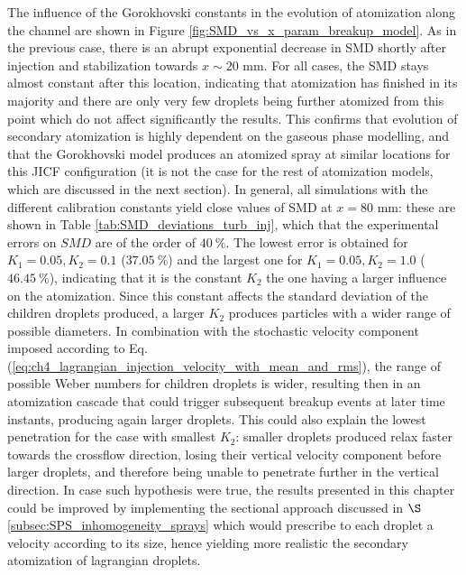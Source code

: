 The influence of the Gorokhovski constants in the evolution of atomization along the channel are shown in Figure \ref{fig:SMD_vs_x_param_breakup_model}. As in the previous case, there is an abrupt exponential decrease in SMD shortly after injection and stabilization towards $x \sim 20$ mm. For all cases, the SMD stays almost constant after this location, indicating that atomization has finished in its majority and there are only very few droplets being further atomized from this point which do not affect significantly the results. This confirms that evolution of secondary atomization is highly dependent on the gaseous phase modelling, and that the Gorokhovski model produces an atomized spray at similar locations for this JICF configuration (it is not the case for the rest of atomization models, which are discussed in the next section). In general, all simulations with the different calibration constants yield close values of SMD at $x = 80$ mm: these are shown in Table \ref{tab:SMD_deviations_turb_inj}, which that the experimental errors on $SMD$ are of the order of $40~\%$. The lowest error is obtained for $K_1 = 0.05, K_2 = 0.1$ ($37.05~\%$) and the largest one for $K_1 = 0.05, K_2 = 1.0$ ($46.45~\%$), indicating that it is the constant $K_2$ the one having a larger influence on the atomization. Since this constant affects the standard deviation of the children droplets produced, a larger $K_2$ produces particles with a wider range of possible diameters. In combination with the stochastic velocity component imposed according to Eq. (\ref{eq:ch4_lagrangian_injection_velocity_with_mean_and_rms}), the range of possible Weber numbers for children droplets is wider, resulting then in an atomization cascade that could trigger subsequent breakup events at later time instants, producing again larger droplets. This could also explain the lowest penetration for the case with smallest $K_2$: smaller droplets produced relax faster towards the crossflow direction, losing their vertical velocity component before larger droplets, and therefore being unable to penetrate further in the vertical direction.
In case such hypothesis were true, the results presented in this chapter could be improved by implementing the sectional approach discussed in $\S$\ref{subsec:SPS_inhomogeneity_sprays} which would prescribe to each droplet a velocity according to its size, hence yielding more realistic the secondary atomization of lagrangian droplets.

